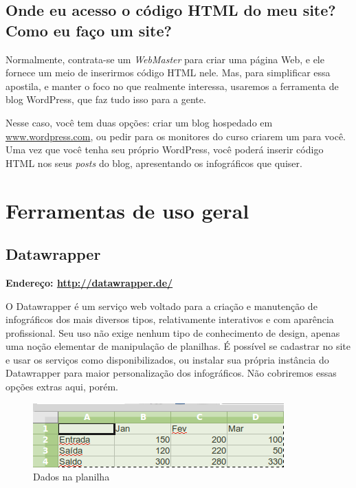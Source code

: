 \documentclass[12pt,onecolumn]{article}
\begin{document}
  \subsection{Onde eu acesso o código HTML do meu site? Como eu faço um site?}
    Normalmente, contrata-se um \textit{WebMaster} para criar uma página Web, e
    ele fornece um meio de inserirmos código HTML nele. Mas, para simplificar
    essa apostila, e manter o foco no que realmente interessa, usaremos a
    ferramenta de blog WordPress, que faz tudo isso para a gente.
    
    Nesse caso, você tem duas opções: criar um blog hospedado em
    \url{www.wordpress.com}, ou pedir para os monitores do curso criarem um
    para você\footnotemark. Uma vez que você tenha seu próprio WordPress, você
    poderá inserir código HTML nos seus \textit{posts} do blog, apresentando os
    infográficos que quiser.
    

\clearpage
\section{Ferramentas de uso geral}
  \subsection{Datawrapper}
     \textbf{Endereço: \url{http://datawrapper.de/}}
    
    O Datawrapper é um serviço web voltado para a criação e manutenção de
    infográficos dos mais diversos tipos, relativamente interativos e com
    aparência profissional. Seu uso não exige nenhum tipo de conhecimento de
    design, apenas uma noção elementar de manipulação de planilhas. É possível
    se cadastrar no site e usar os serviços como disponibilizados, ou instalar
    sua própria instância do Datawrapper para maior personalização dos
    infográficos. Não cobriremos essas opções extras aqui, porém.
    
    \begin{figure}[H]
      \begin{center}
        \includegraphics[scale=0.5]{dados-calc.png}
        \caption{Dados na planilha}
        \label{fig:dados-calc}
      \end{center}
    \end{figure}
    
\end{document}
